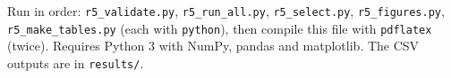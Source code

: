 \documentclass[10.5pt,a4paper]{article}
\begin{document}
Run in order: \texttt{r5\_validate.py}, \texttt{r5\_run\_all.py}, \texttt{r5\_select.py}, \texttt{r5\_figures.py}, \texttt{r5\_make\_tables.py} (each with \texttt{python}), then compile this file with \texttt{pdflatex} (twice). Requires Python 3 with NumPy, pandas and matplotlib. The CSV outputs are in \texttt{results/}.
\end{document}
